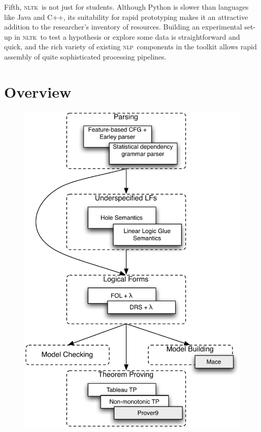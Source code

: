 \documentclass[11pt,a4paper]{article}
\newcommand{\NLP}{\textsc{nlp}}
\newcommand{\NLTK}{\textsc{nltk}}
\begin{document}
Fifth, \NLTK\ is not just for students. Although Python is slower than
languages like Java and C++, its suitability for rapid prototyping
makes it an attractive addition to the researcher's inventory of
resources. Building an experimental set-up in \NLTK\ to test a
hypothesis or explore some data is straightforward and quick, and the
rich variety of existing \NLP\ components in the toolkit allows rapid
assembly of quite sophisticated processing pipelines.


\section{Overview}
\label{sec:overview}


\begin{figure}
  \centering
\includegraphics[scale=.6]{modules}  
\end{figure}
\end{document}
